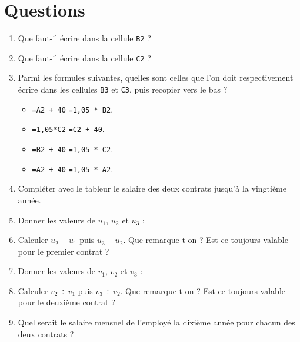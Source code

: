 \documentclass[10pt,french]{article}
\begin{document}
\section*{Questions}
\begin{enumerate}
    \item Que faut-il écrire dans la cellule {\tt B2} ? \dotfill\bigskip
    \item Que faut-il écrire dans la cellule {\tt C2} ? \dotfill\bigskip
    \item Parmi les formules suivantes, quelles sont celles que l'on doit respectivement écrire dans les cellules {\tt B3} et {\tt C3}, puis recopier vers le bas ?
        \begin{itemize}
            \item \texttt{=A2 + 40} \qetq \texttt{=1,05 * B2}.
            \item \texttt{=1,05*C2} \qetq \texttt{=C2 + 40}.
            \item \texttt{=B2 + 40} \qetq \texttt{=1,05 * C2}.
            \item \texttt{=A2 + 40} \qetq \texttt{=1,05 * A2}.
        \end{itemize}
    \item Compléter avec le tableur le salaire des deux contrats jusqu'à la vingtième année.\bigskip
    \item Donner les valeurs de $u_1$, $u_2$ et $u_3$ : \dotfill\par\bigskip
    \item Calculer $u_2 - u_1$ puis $u_3 - u_2$. Que remarque-t-on ? Est-ce toujours valable pour le premier contrat ? \dotfill\par\bigskip\dotfill\par\bigskip\dotfill\bigskip
    \item Donner les valeurs de $v_1$, $v_2$ et $v_3$ : \dotfill\par\bigskip
    \item Calculer $v_2 \div v_1$ puis $v_3 \div v_2$. Que remarque-t-on ? Est-ce toujours valable pour le deuxième contrat ? \dotfill\par\bigskip\dotfill\par\bigskip\dotfill\par\bigskip\dotfill\bigskip
    \item Quel serait le salaire mensuel de l'employé la dixième année pour chacun des deux contrats ? \par\bigskip\dotfill
\end{enumerate}
\end{document}
